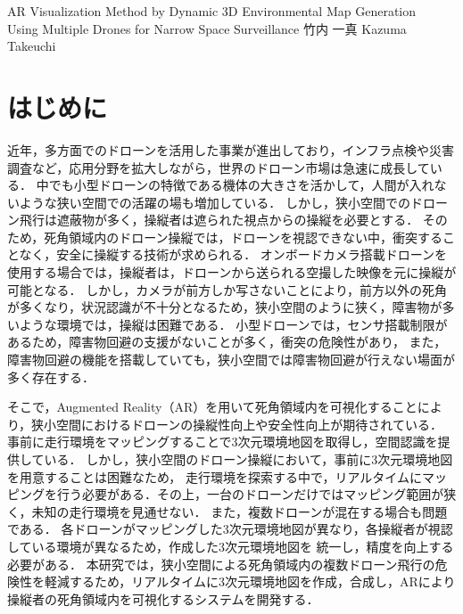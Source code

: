 \documentclass[a4paper,10pt,twocolumn,uplatex]{jsarticle}
\date{11}
\begin{document}
{AR Visualization Method by Dynamic 3D Environmental Map Generation\\ Using Multiple Drones for Narrow Space Surveillance}
{竹内 一真}
{Kazuma Takeuchi}


\section{はじめに}
近年，多方面でのドローンを活用した事業が進出しており，インフラ点検や災害調査など，応用分野を拡大しながら，世界のドローン市場は急速に成長している\cite{Nonami}．
中でも小型ドローンの特徴である機体の大きさを活かして，人間が入れないような狭い空間での活躍の場も増加している．
しかし，狭小空間でのドローン飛行は遮蔽物が多く，操縦者は遮られた視点からの操縦を必要とする．
そのため，死角領域内のドローン操縦では，ドローンを視認できない中，衝突することなく，安全に操縦する技術が求められる．
オンボードカメラ搭載ドローンを使用する場合では，操縦者は，ドローンから送られる空撮した映像を元に操縦が可能となる．
しかし，カメラが前方しか写さないことにより，前方以外の死角が多くなり，状況認識が不十分となるため\cite{Green}，狭小空間のように狭く，障害物が多いような環境では，操縦は困難である．
小型ドローンでは，センサ搭載制限があるため，障害物回避の支援がないことが多く，衝突の危険性があり，
また，障害物回避の機能を搭載していても，狭小空間では障害物回避が行えない場面が多く存在する\cite{syohou}．
\par
そこで，Augmented Reality（AR）を用いて死角領域内を可視化することにより，狭小空間におけるドローンの操縦性向上や安全性向上が期待されている\cite{Erat}．
事前に走行環境をマッピングすることで3次元環境地図を取得し，空間認識を提供している．
しかし，狭小空間のドローン操縦において，事前に3次元環境地図を用意することは困難なため，
走行環境を探索する中で，リアルタイムにマッピングを行う必要がある．その上，一台のドローンだけではマッピング範囲が狭く，未知の走行環境を見通せない．
また，複数ドローンが混在する場合も問題である．
各ドローンがマッピングした3次元環境地図が異なり，各操縦者が視認している環境が異なるため，作成した3次元環境地図を
統一し，精度を向上する必要がある．
本研究では，狭小空間による死角領域内の複数ドローン飛行の危険性を軽減するため，リアルタイムに3次元環境地図を作成，合成し，ARにより操縦者の死角領域内を可視化するシステムを開発する．
\end{document}
